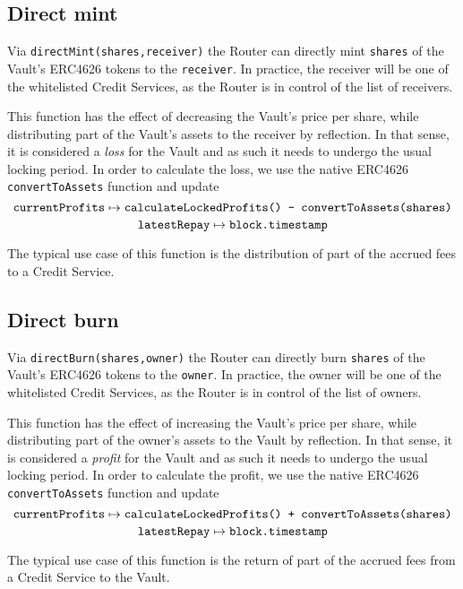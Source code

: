 \documentclass[a4paper,10 pt]{article}
\theoremstyle{definition}
\begin{document}
\subsection{Direct mint}\label{directMint}
Via \verb|directMint(shares,receiver)| the Router can directly mint \verb|shares| of the Vault's ERC4626 tokens to the \verb|receiver|. In practice, the receiver will be one of the whitelisted Credit Services, as the Router is in control  of the list of receivers.

This function has the effect of decreasing the Vault's price per share, while distributing part of the Vault's assets to the receiver by reflection. In that sense, it is considered a {\it loss} for the Vault and as such it needs to undergo the usual locking period. In order to calculate the loss, we use the native ERC4626 \verb|convertToAssets| function and update 
$$\verb|currentProfits| \mapsto \verb|calculateLockedProfits() - convertToAssets(shares)|$$ 
$$\verb|latestRepay| \mapsto \verb|block.timestamp|$$

The typical use case of this function is the distribution of part of the accrued fees to a Credit Service.

\subsection{Direct burn}\label{directBurn}
Via \verb|directBurn(shares,owner)| the Router can directly burn \verb|shares| of the Vault's ERC4626 tokens to the \verb|owner|. In practice, the owner will be one of the whitelisted Credit Services, as the Router is in control of the list of owners.

This function has the effect of increasing the Vault's price per share, while distributing part of the owner's assets to the Vault by reflection. In that sense, it is considered a {\it profit} for the Vault and as such it needs to undergo the usual locking period. In order to calculate the profit, we use the native ERC4626 \verb|convertToAssets| function and update 
$$\verb|currentProfits| \mapsto \verb|calculateLockedProfits() + convertToAssets(shares)|$$ 
$$\verb|latestRepay| \mapsto \verb|block.timestamp|$$

The typical use case of this function is the return of part of the accrued fees from a Credit Service to the Vault.
\end{document}
